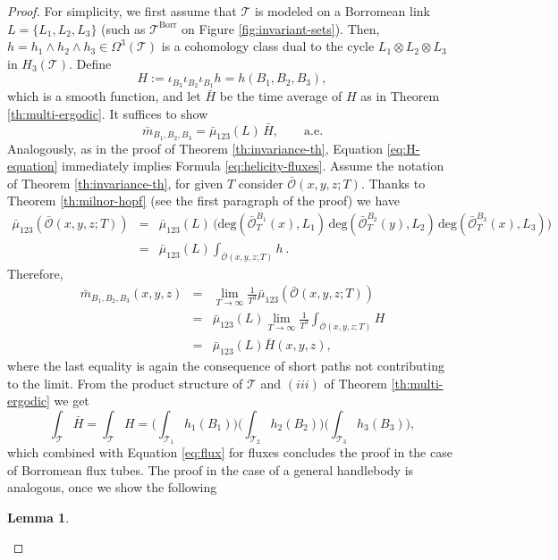 \documentclass[12pt]{article}
\numberwithin{equation}{section}
\newtheorem{lemma}[theorem]{Lemma}
\begin{document}
\begin{proof}
 For simplicity, we first assume that $\mathcal{T}$ is modeled on a Borromean link
 $L=\{L_1,L_2,L_3\}$ (such as $\mathcal{T}^\text{Borr}$ on Figure \ref{fig:invariant-sets}). Then, $h=h_1\wedge h_2\wedge h_3\in \Omega^3(\mathcal{T})$  is a cohomology class dual to the cycle $L_1\otimes L_2\otimes L_3$ in $H_3(\mathcal{T})$. Define
 \[
  H:=\iota_{B_3}\iota_{B_2}\iota_{B_1} h=h(B_1,B_2,B_3),
 \]
 which is a smooth function, and let $\bar{H}$ be the time average of $H$ as in Theorem \ref{th:multi-ergodic}. It suffices to show 
 \begin{equation}\label{eq:H-equation}
   \bar{m}_{B_1,B_2,B_3}=\bar{\mu}_{123}(L)\,\bar{H},\qquad \text{a.e.}
 \end{equation}
  Analogously, as in the proof of Theorem \ref{th:invariance-th}, 
 Equation \eqref{eq:H-equation} immediately implies Formula \eqref{eq:helicity-fluxes}. 
 Assume the notation of Theorem \ref{th:invariance-th}, for given $T$ consider $\bar{\mathscr{O}}(x,y,z;T)$. 
Thanks to Theorem \ref{th:milnor-hopf} (see the first paragraph of the proof) we have 
 \begin{eqnarray*}
  \bar{\mu}_{123}(\bar{\mathscr{O}}(x,y,z;T)) & = & \bar{\mu}_{123}(L)\,\bigl(\text{deg}(\bar{\mathscr{O}}^{B_1}_T(x),L_1)\,\text{deg}(\bar{\mathscr{O}}^{B_2}_T(y),L_2)\,\text{deg}(\bar{\mathscr{O}}^{B_3}_T(x),L_3)\bigr)\\
  & = & \bar{\mu}_{123}(L)\int_{\bar{\mathscr{O}}(x,y,z;T)} h\ .
 \end{eqnarray*}
Therefore,
 \begin{eqnarray*}
  \bar{m}_{B_1,B_2, B_3}(x,y,z) & = & \lim_{T\to \infty} \frac{1}{T^3}\bar{\mu}_{123}(\bar{\mathscr{O}}(x,y,z;T))\\
  & = & \bar{\mu}_{123}(L)\lim_{T\to \infty} \frac{1}{T^3}\int_{\bar{\mathscr{O}}(x,y,z;T)} H\\
  & =  &\bar{\mu}_{123}(L) \bar{H}(x,y,z),
 \end{eqnarray*}
where the last equality is again the consequence of short paths not contributing to the limit.
From the product structure of $\mathcal{T}$ and $(iii)$ of Theorem \ref{th:multi-ergodic} we get
 \[
  \int_\mathcal{T} \bar{H} =\int_\mathcal{T} H=\bigl(\int_{\mathcal{T}_1} h_1(B_1) \bigr)\bigl(\int_{\mathcal{T}_2} h_2(B_2) \bigr)\bigl(\int_{\mathcal{T}_3} h_3(B_3) \bigr),
 \]
 which combined with Equation \eqref{eq:flux} for fluxes concludes the proof in the case of Borromean flux tubes.
The proof in the case of a general handlebody is analogous, once we show the following 
\begin{lemma}

\end{lemma}
\end{proof}
\end{document}
